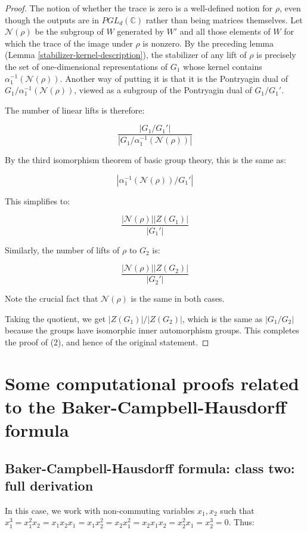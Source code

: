 \documentclass{ucetd}
\begin{document}
\begin{proof}
  The notion of whether the trace is zero is a well-defined notion for
  $\rho$, even though the outputs are in $PGL_d(\mathbb{C})$ rather
  than being matrices themselves. Let $\mathcal{N}(\rho)$ be the
  subgroup of $W$ generated by $W'$ and all those elements of $W$ for
  which the trace of the image under $\rho$ is nonzero. By the
  preceding lemma (Lemma \ref{stabilizer-kernel-description}), the
  stabilizer of any lift of $\rho$ is precisely the set of
  one-dimensional representations of $G_1$ whose kernel contains
  $\alpha_1^{-1}(\mathcal{N}(\rho))$. Another way of putting it is
  that it is the Pontryagin dual of
  $G_1/\alpha_1^{-1}(\mathcal{N}(\rho))$, viewed as a subgroup of the
  Pontryagin dual of $G_1/G_1'$.


  The number of linear lifts is therefore:

  $$\frac{|G_1/G_1'|}{|G_1/\alpha_1^{-1}(\mathcal{N}(\rho))|}$$

  By the third isomorphism theorem of basic group theory, this is the
  same as:

  $$|\alpha_1^{-1}(\mathcal{N}(\rho))/G_1'|$$

  This simplifies to:

  $$\frac{|\mathcal{N}(\rho)||Z(G_1)|}{|G_1'|}$$

  Similarly, the number of lifts of $\rho$ to $G_2$ is:

  $$\frac{|\mathcal{N}(\rho)||Z(G_2)|}{|G_2'|}$$

  Note the crucial fact that $\mathcal{N}(\rho)$ is the same in both
  cases.

  Taking the quotient, we get $|Z(G_1)|/|Z(G_2)|$, which is the same
  as $|G_1/G_2|$ because the groups have isomorphic inner automorphism
  groups. This completes the proof of (2), and hence of the original
  statement.
\end{proof}

\section{Some computational proofs related to the Baker-Campbell-Hausdorff formula}

\subsection{Baker-Campbell-Hausdorff formula: class two: full derivation}\label{appsec:bch-class-two}

In this case, we work with non-commuting variables $x_1,x_2$ such that
$x_1^3 = x_1^2x_2 = x_1x_2x_1 = x_1x_2^2 = x_2x_1^2 = x_2x_1x_2 =
x_2^2x_1 = x_2^3 = 0$. Thus:
\end{document}
